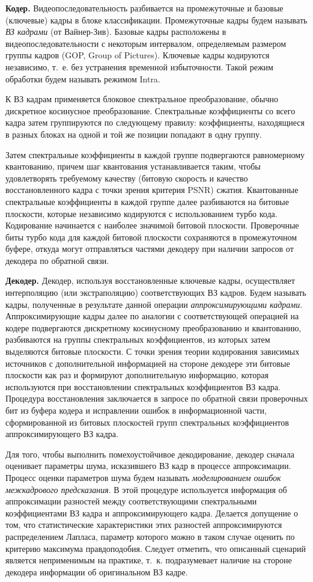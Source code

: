\textbf{Кодер.} Видеопоследовательность разбивается на промежуточные и базовые (ключевые) кадры в блоке классификации. Промежуточные кадры будем называть \textit{ВЗ кадрами} (от Вайнер-Зив). Базовые кадры расположены в видеопоследовательности с некоторым интервалом, определяемым размером группы кадров (GOP, Group of Pictures). Ключевые кадры кодируются независимо, т.~е. без устранения временной избыточности. Такой режим обработки будем называть режимом Intra.

К ВЗ кадрам применяется блоковое спектральное преобразование, обычно дискретное косинусное преобразование. Спектральные коэффициенты со всего кадра затем группируются по следующему правилу: коэффициенты, находящиеся в разных блоках на одной и той же позиции попадают в одну группу.

Затем спектральные коэффициенты в каждой группе подвергаются равномерному квантованию, причем шаг квантования устанавливается таким, чтобы удовлетворять требуемому качеству (битовую скорость и качество восстановленного кадра с точки зрения критерия PSNR) сжатия. Квантованные спектральные коэффициенты в каждой группе далее разбиваются на битовые плоскости, которые независимо кодируются с использованием турбо кода. Кодирование начинается с наиболее значимой битовой плоскости. Проверочные биты турбо кода для каждой битовой плоскости сохраняются в промежуточном буфере, откуда могут отправляться частями декодеру при наличии запросов от декодера по обратной связи.

\textbf{Декодер.} Декодер, используя восстановленные ключевые кадры, осуществляет интерполяцию (или экстраполяцию) соответствующих ВЗ кадров. Будем называть кадры, полученные в результате данной операции \textit{аппроксимирующими кадрами}. Аппроксимирующие кадры далее по аналогии с соответствующей операцией на кодере подвергаются дискретному косинусному преобразованию и квантованию, разбиваются на группы спектральных коэффициентов, из которых затем выделяются битовые плоскости. С точки зрения теории кодирования зависимых источников с дополнительной информацией на стороне декодере эти битовые плоскости как раз и формируют дополнительную информацию, которая используются при восстановлении спектральных коэффициентов ВЗ кадра. Процедура восстановления заключается в запросе по обратной связи проверочных бит из буфера кодера и исправлении ошибок в информационной части, сформированной из битовых плоскостей групп спектральных коэффициентов аппроксимирующего ВЗ кадра.

Для того, чтобы выполнить помехоустойчивое декодирование, декодер сначала оценивает параметры шума, исказившего ВЗ кадр в процессе аппроксимации.  Процесс оценки параметров шума будем называть \textit{моделированием ошибок межкадрового предсказания}. В этой процедуре используется информация об аппроксимации разностей между соответствующими спектральными коэффициентами ВЗ кадра и аппроксимирующего кадра. Делается допущение о том, что статистические характеристики этих разностей аппроксимируются распределением Лапласа, параметр которого можно в таком случае оценить по критерию максимума правдоподобия. Следует отметить, что описанный сценарий является неприменимым на практике, т.~к. подразумевает наличие на стороне декодера информации об оригинальном ВЗ кадре.

